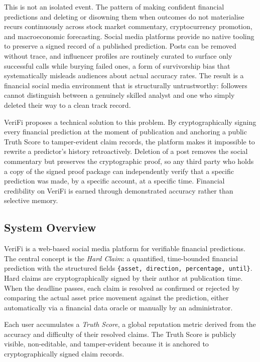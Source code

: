 \documentclass[a4paper,12pt]{report}
\begin{document}
This is not an isolated event. The pattern of making confident financial predictions and deleting or disowning them when outcomes do not materialise recurs continuously across stock market commentary, cryptocurrency promotion, and macroeconomic forecasting. Social media platforms provide no native tooling to preserve a signed record of a published prediction. Posts can be removed without trace, and influencer profiles are routinely curated to surface only successful calls while burying failed ones, a form of survivorship bias that systematically misleads audiences about actual accuracy rates. The result is a financial social media environment that is structurally untrustworthy: followers cannot distinguish between a genuinely skilled analyst and one who simply deleted their way to a clean track record.

VeriFi proposes a technical solution to this problem. By cryptographically signing every financial prediction at the moment of publication and anchoring a public Truth Score to tamper-evident claim records, the platform makes it impossible to rewrite a predictor's history retroactively. Deletion of a post removes the social commentary but preserves the cryptographic proof, so any third party who holds a copy of the signed proof package can independently verify that a specific prediction was made, by a specific account, at a specific time. Financial credibility on VeriFi is earned through demonstrated accuracy rather than selective memory.

\subsection{System Overview}

VeriFi is a web-based social media platform for verifiable financial predictions. The central concept is the \textit{Hard Claim}: a quantified, time-bounded financial prediction with the structured fields \texttt{\{asset,\allowbreak{} direction,\allowbreak{} percentage,\allowbreak{} until\}}. Hard claims are cryptographically signed by their author at publication time. When the deadline passes, each claim is resolved as confirmed or rejected by comparing the actual asset price movement against the prediction, either automatically via a financial data oracle or manually by an administrator.

Each user accumulates a \textit{Truth Score}, a global reputation metric derived from the accuracy and difficulty of their resolved claims. The Truth Score is publicly visible, non-editable, and tamper-evident because it is anchored to cryptographically signed claim records.
\end{document}
